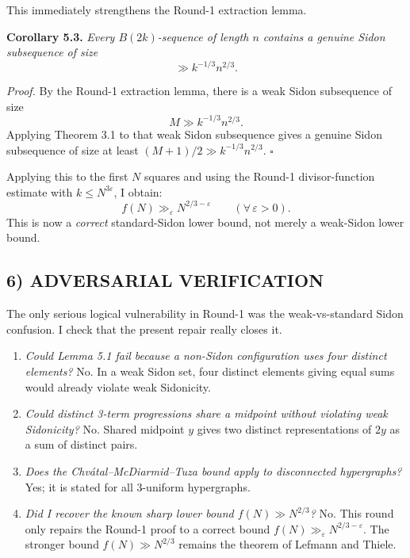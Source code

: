 \medskip
This immediately strengthens the Round-1 extraction lemma.

\medskip
\noindent\textbf{Corollary 5.3.} \emph{Every $B(2k)$-sequence of length $n$ contains a genuine Sidon subsequence of size}
\[
\gg k^{-1/3}n^{2/3}.
\]

\medskip
\noindent\emph{Proof.} By the Round-1 extraction lemma, there is a weak Sidon subsequence of size
\[
M\gg k^{-1/3}n^{2/3}.
\]
Applying Theorem 3.1 to that weak Sidon subsequence gives a genuine Sidon subsequence of size at least $(M+1)/2\gg k^{-1/3}n^{2/3}$. \hfill$\square$

\medskip
Applying this to the first $N$ squares and using the Round-1 divisor-function estimate with $k\le N^{3\varepsilon}$, I obtain:
\[
 f(N)\gg_\varepsilon N^{2/3-\varepsilon}
\qquad (\forall\,\varepsilon>0).
\]
This is now a \emph{correct} standard-Sidon lower bound, not merely a weak-Sidon lower bound.

\subsection*{6) ADVERSARIAL VERIFICATION}
The only serious logical vulnerability in Round-1 was the weak-vs-standard Sidon confusion. I check that the present repair really closes it.

\begin{enumerate}
\item \emph{Could Lemma 5.1 fail because a non-Sidon configuration uses four distinct elements?} No. In a weak Sidon set, four distinct elements giving equal sums would already violate weak Sidonicity.

\item \emph{Could distinct 3-term progressions share a midpoint without violating weak Sidonicity?} No. Shared midpoint $y$ gives two distinct representations of $2y$ as a sum of distinct pairs.

\item \emph{Does the Chv\'atal--McDiarmid--Tuza bound apply to disconnected hypergraphs?} Yes; it is stated for all 3-uniform hypergraphs.

\item \emph{Did I recover the known sharp lower bound $f(N)\gg N^{2/3}$?} No. This round only repairs the Round-1 proof to a correct bound $f(N)\gg_\varepsilon N^{2/3-\varepsilon}$. The stronger bound $f(N)\gg N^{2/3}$ remains the theorem of Lefmann and Thiele.
\end{enumerate}

